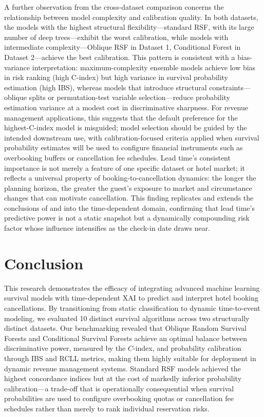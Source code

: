 \documentclass[pdflatex,sn-mathphys-ay]{sn-jnl}
\theoremstyle{thmstyleone}%
\theoremstyle{thmstyletwo}%
\theoremstyle{thmstylethree}%
\begin{document}
A further observation from the cross-dataset comparison concerns the relationship between model complexity and calibration quality. In both datasets, the models with the highest structural flexibility—standard RSF, with its large number of deep trees—exhibit the worst calibration, while models with intermediate complexity—Oblique RSF in Dataset 1, Conditional Forest in Dataset 2—achieve the best calibration. This pattern is consistent with a bias-variance interpretation: maximum-complexity ensemble models achieve low bias in risk ranking (high C-index) but high variance in survival probability estimation (high IBS), whereas models that introduce structural constraints—oblique splits or permutation-test variable selection—reduce probability estimation variance at a modest cost in discriminative sharpness. For revenue management applications, this suggests that the default preference for the highest-C-index model is misguided; model selection should be guided by the intended downstream use, with calibration-focused criteria applied when survival probability estimates will be used to configure financial instruments such as overbooking buffers or cancellation fee schedules. Lead time's consistent importance is not merely a feature of one specific dataset or hotel market; it reflects a universal property of booking-to-cancellation dynamics: the longer the planning horizon, the greater the guest's exposure to market and circumstance changes that can motivate cancellation. This finding replicates and extends the conclusions of \cite{antonio2017predicting} and \cite{luo2025hotel} into the time-dependent domain, confirming that lead time's predictive power is not a static snapshot but a dynamically compounding risk factor whose influence intensifies as the check-in date draws near.

\section{Conclusion}
\label{sec:conclusion}

This research demonstrates the efficacy of integrating advanced machine learning survival models with time-dependent XAI to predict and interpret hotel booking cancellations. By transitioning from static classification to dynamic time-to-event modeling, we evaluated 10 distinct survival algorithms across two structurally distinct datasets. Our benchmarking revealed that Oblique Random Survival Forests and Conditional Survival Forests achieve an optimal balance between discriminative power, measured by the $C$-index, and probability calibration through IBS and RCLL metrics, making them highly suitable for deployment in dynamic revenue management systems. Standard RSF models achieved the highest concordance indices but at the cost of markedly inferior probability calibration—a trade-off that is operationally consequential when survival probabilities are used to configure overbooking quotas or cancellation fee schedules rather than merely to rank individual reservation risks.
\end{document}
